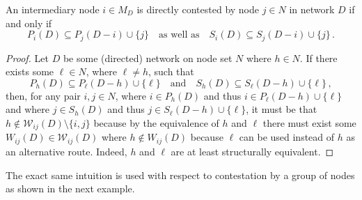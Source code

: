 \begin{proposition}
	An intermediary node $i \in M_D$ is directly contested by node $j \in N$ in network $D$ if and only if
	\begin{equation} \label{Directly Contested}
	    P_{i}(D) \subseteq P_{j} (D - i) \cup \{j\} \quad \mbox{as well as} \quad S_{i} (D) \subseteq S_{j} (D - i) \cup \{ j \} \, .
	\end{equation}
\end{proposition}

\begin{proof}
Let $D$ be some (directed) network on node set $N$ where $h \in N$. If there exists some $\ell \in N$, where $\ell \neq h$, such that
\begin{equation}
    P_{h}(D) \subseteq P_{\ell} (D - h) \cup \{\ell\} \quad \mbox{and} \quad S_{h} (D) \subseteq S_{\ell} (D - h) \cup \{ \ell \} \, ,
\end{equation}
then, for any pair $i, j \in N$, where $i \in P_{h}(D)$ and thus $i \in P_{\ell} (D - h) \cup \{\ell\}$ and where $j \in S_{h}(D)$ and thus $j \in S_{\ell} (D - h) \cup \{ \ell \}$, it must be that $h \notin \mathcal{W}_{ij}(D) \setminus \{i, j\}$ because by the equivalence of $h$ and $\ell$ there must exist some $W_{ij}(D) \in \mathcal{W}_{ij}(D)$ where $h \notin W_{ij}(D)$ because $\ell$ can be used instead of $h$ as an alternative route. Indeed, $h$ and $\ell$ are at least structurally equivalent.
 \end{proof}

\noindent
The exact same intuition is used with respect to contestation by a group of nodes as shown in the next example.

